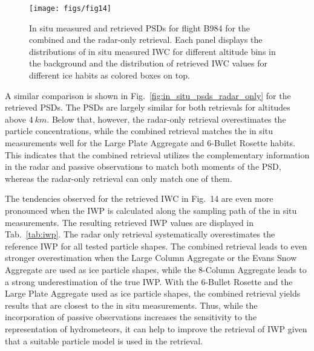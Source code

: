 \documentclass[journal abbreviation, manuscript]{copernicus}
\begin{document}
\begin{figure}[!hbpt]
  \centering
  \texttt{[image: figs/fig14]}
  \caption{In situ measured and retrieved PSDs for flight B984
    for the combined and the radar-only retrieval. Each panel displays
    the distributions of in situ measured IWC for different altitude
    bins in the background and the distribution of retrieved IWC values
    for different ice habits as colored boxes on top.}
  \label{fig:in_situ_iwc_radar_only}
\end{figure}

A similar comparison is shown in Fig.~\ref{fig:in_situ_psds_radar_only} for the
retrieved PSDs. The PSDs are largely similar for both retrievals for altitudes
above $4\ \unit{km}$. Below that, however, the radar-only retrieval
overestimates the particle concentrations, while the combined retrieval matches
the in situ measurements well for the Large Plate Aggregate and 6-Bullet Rosette
habits. This indicates that the combined retrieval utilizes the complementary
information in the radar and passive observations to match both moments of the
PSD, whereas the radar-only retrieval can only match one of them.

The tendencies observed for the retrieved IWC in Fig.~14 are even more
pronounced when the IWP is calculated along the sampling path of the in situ
measurements. The resulting retrieved IWP values are displayed in
Tab.~\ref{tab:iwp}. The radar only retrieval systematically overestimates the
reference IWP for all tested particle shapes. The combined retrieval leads to
even stronger overestimation when the Large Column Aggregate or the Evans Snow
Aggregate are used as ice particle shapes, while the 8-Column Aggregate leads to
a strong underestimation of the true IWP. With the 6-Bullet Rosette and the
Large Plate Aggregate used as ice particle shapes, the combined retrieval yields
results that are closest to the in situ measurements. Thus, while the
incorporation of passive observations increases the sensitivity to the
representation of hydrometeors, it can help to improve the retrieval of IWP
given that a suitable particle model is used in the retrieval.
\end{document}
